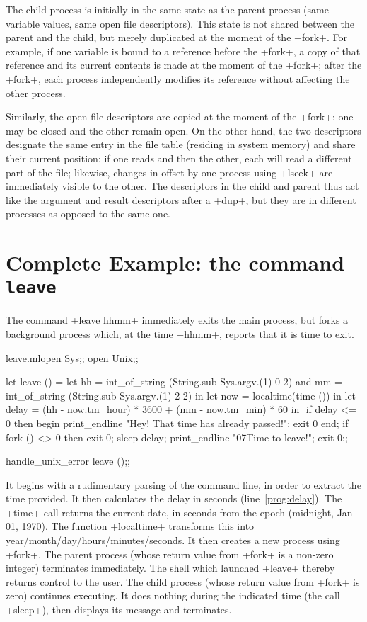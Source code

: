 The child process is initially in the same state as the parent process
(same variable values, same open file descriptors).  This state is not
shared between the parent and the child, but merely duplicated at the
moment of the \ml+fork+.  For example, if one variable is bound to a
reference before the \ml+fork+, a copy of that reference and its
current contents is made at the moment of the \ml+fork+; after the
\ml+fork+, each process independently modifies its 
reference without affecting the other process.

Similarly, the open file descriptors are copied at the moment of the
\ml+fork+: one may be closed and the other remain open.  On the other
hand, the two descriptors designate the same entry in the file table
(residing in system memory) and share their current position: if one
reads and then the other, each will read a different part of the file;
likewise, changes in offset by one process using \ml+lseek+ are
immediately visible to the other. The descriptors in the child and
parent thus act like the argument and result descriptors after a
\ml+dup+, but they are in different processes as opposed to the same
one.

\section{Complete Example: the command {\normalfont\texttt{leave}}}

The command \ml+leave hhmm+ immediately exits the main process, but
forks a background process which, at the time \ml+hhmm+, reports that
it is time to exit.
%
\begin{listingcodefile}[style=numbers]{leave.ml}open Sys;;
open Unix;;

let leave () =
 let hh = int_of_string (String.sub Sys.argv.(1) 0 2)
 and mm = int_of_string (String.sub Sys.argv.(1) 2 2) in
 let now = localtime(time ()) in
 let delay = (hh - now.tm_hour) * 3600 + (mm - now.tm_min) * 60 in
$\label{prog:delay}$
 if delay <= 0 then begin
   print_endline "Hey! That time has already passed!";
   exit 0
 end;
 if fork () <> 0 then exit 0;
 sleep delay;
 print_endline "\007Time to leave!";
 exit 0;;

handle_unix_error leave ();;
\end{listingcodefile}
%

It begins with a rudimentary parsing of the command line, in order to
extract the time provided.  It then calculates the delay in seconds
(line~\ref{prog:delay}). The \ml+time+ call returns the current
date, in seconds from the epoch (midnight, Jan 01, 1970).  The
function \ml+localtime+ transforms this into
year/month/day/hours/minutes/seconds.  It then creates a new process
using \ml+fork+.  The parent process (whose return value from
\ml+fork+ is a non-zero integer) terminates immediately.  The shell
which launched \ml+leave+ thereby returns control to the user.  The
child process (whose return value from \ml+fork+ is zero) continues
executing.  It does nothing during the indicated time (the call
\ml+sleep+), then displays its message and terminates.

